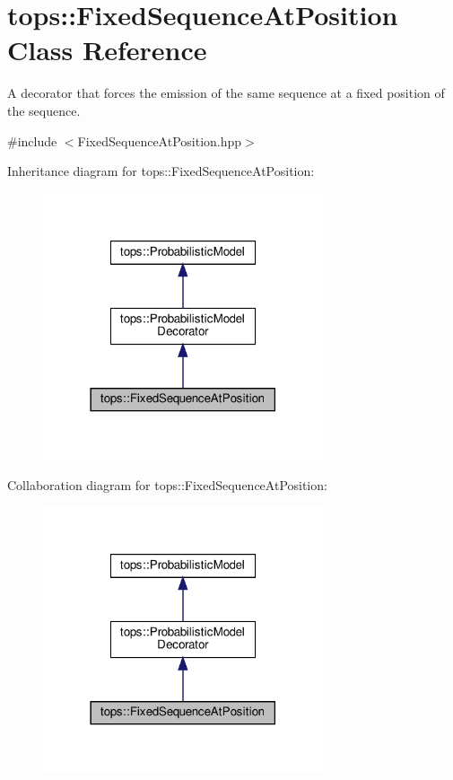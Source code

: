 \hypertarget{classtops_1_1FixedSequenceAtPosition}{}\section{tops\+:\+:Fixed\+Sequence\+At\+Position Class Reference}
\label{classtops_1_1FixedSequenceAtPosition}


A decorator that forces the emission of the same sequence at a fixed position of the sequence.  




{\ttfamily \#include $<$Fixed\+Sequence\+At\+Position.\+hpp$>$}



Inheritance diagram for tops\+:\+:Fixed\+Sequence\+At\+Position\+:
\nopagebreak
\begin{figure}[H]
\begin{center}
\leavevmode
\includegraphics[width=234pt]{classtops_1_1FixedSequenceAtPosition__inherit__graph}
\end{center}
\end{figure}


Collaboration diagram for tops\+:\+:Fixed\+Sequence\+At\+Position\+:
\nopagebreak
\begin{figure}[H]
\begin{center}
\leavevmode
\includegraphics[width=234pt]{classtops_1_1FixedSequenceAtPosition__coll__graph}
\end{center}
\end{figure}
